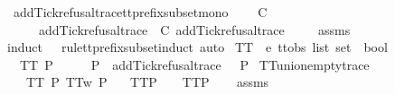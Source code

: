 \endisatagproof
{\isafoldproof}%
%
\isadelimproof
\isanewline
%
\endisadelimproof
\isanewline
{}\isamarkupfalse%
\ add{\isacharunderscore}Tick{\isacharunderscore}refusal{\isacharunderscore}trace{\isacharunderscore}tt{\isacharunderscore}prefix{\isacharunderscore}subset{\isacharunderscore}mono{\isacharcolon}\isanewline
\ \ \ {\isachardoublequoteopen}{\isasymrho}\ {\isasymlesssim}\isactrlsub C\ {\isasymsigma}{\isachardoublequoteclose}\isanewline
\ \ \ \ \ {\isachardoublequoteopen}add{\isacharunderscore}Tick{\isacharunderscore}refusal{\isacharunderscore}trace\ {\isasymrho}\ {\isasymlesssim}\isactrlsub C\ add{\isacharunderscore}Tick{\isacharunderscore}refusal{\isacharunderscore}trace\ {\isasymsigma}{\isachardoublequoteclose}\isanewline
%
\isadelimproof
\ \ %
\endisadelimproof
%
\isatagproof
{}\isamarkupfalse%
\ assms\ \isamarkupfalse%
{\isacharparenleft}induct\ {\isasymrho}\ {\isasymsigma}\ rule{\isacharcolon}tt{\isacharunderscore}prefix{\isacharunderscore}subset{\isachardot}induct{\isacharcomma}\ auto{\isacharparenright}%
\endisatagproof
{\isafoldproof}%
%
\isadelimproof
\isanewline
%
\endisadelimproof
\isanewline
{}\isamarkupfalse%
\ TT{}\ {\isacharcolon}{\isacharcolon}\ {\isachardoublequoteopen}{\isacharprime}e\ ttobs\ list\ set\ {\isasymRightarrow}\ bool{\isachardoublequoteclose}\ \isanewline
\ \ {\isachardoublequoteopen}TT{}\ P\ {\isacharequal}\ {\isacharparenleft}{\isasymforall}\ {\isasymrho}{\isachardot}\ {\isasymrho}\ {\isasymin}\ P\ {\isasymlongrightarrow}\ add{\isacharunderscore}Tick{\isacharunderscore}refusal{\isacharunderscore}trace\ {\isasymrho}\ {\isasymin}\ P{\isacharparenright}{\isachardoublequoteclose}\isanewline
\isanewline
{}\isamarkupfalse%
\ TT{}{\isacharunderscore}union{\isacharunderscore}empty{\isacharunderscore}trace{\isacharcolon}\isanewline
\ \ \ {\isachardoublequoteopen}TT{}\ P{\isachardoublequoteclose}\ {\isachardoublequoteopen}TT{}w\ P{\isachardoublequoteclose}\isanewline
\ \ \ {\isachardoublequoteopen}TT{}{\isacharparenleft}P\ {\isasymunion}\ {\isacharbraceleft}{\isacharbrackleft}{\isacharbrackright}{\isacharbraceright}{\isacharparenright}\ {\isacharequal}\ TT{}{\isacharparenleft}P{\isacharparenright}{\isachardoublequoteclose}\isanewline
%
\isadelimproof
\ \ %
\endisadelimproof
%
\isatagproof
{}\isamarkupfalse%
\ assms\ \isamarkupfalse%
